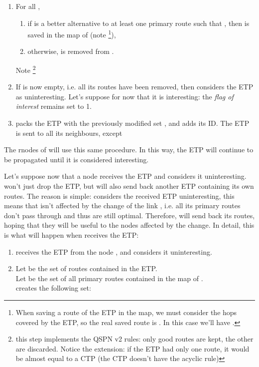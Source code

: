 \documentclass[a4paper]{article}
\begin{document}
\begin{description}
\begin{enumerate}
		If  exists, then  sets 
		\footnote{with this operation we are actually replacing 
		with , in the map }.
		Otherwise,  is copied in the temporary set .\\
		 is sorted, i.e. the routes of the map of  are sorted in
		order of efficiency.
	\item For all ,
		\begin{enumerate}
			\item if  is a better alternative to at least one primary route
				 such that ,
				then   is saved in the map of 
				(note \footnote{When saving a route  of the ETP
				in the map, we must consider the hops covered by the ETP,
				so the real saved route is
				. In this
				case we'll have .}), 
			\item otherwise,  is removed from .
		\end{enumerate}
		Note \footnote{this step implements the QSPN v2 rules: only
		good routes are kept, the other are discarded. Notice
		the extension: if the ETP had only one route, it would be
		almost equal to a CTP (the CTP doesn't have the acyclic rule)}
	\item If  is now empty, i.e. all its routes have been removed, then
		 considers the ETP as uninteresting. Let's suppose for now
		that it is interesting: the \emph{flag of interest} remains
		set to	1.
	\item  packs the ETP with the previously modified
		set , and adds its ID. The ETP is sent to all its neighbours,
		except 
	\end{enumerate}
	The rnodes of  will use this same procedure. In this way, the ETP
	will continue to be propagated until it is considered interesting.

	Let's suppose now that a node  receives the ETP and considers it
	uninteresting.  won't just drop the ETP, but will also send back
	another ETP containing its own routes. The reason is simple: 
	considers the received ETP uninteresting, this means that  isn't
	affected by the change of the link , i.e. all its primary routes don't
	pass through  and thus are still optimal. Therefore,  will
	send back its routes, hoping that they will be useful to the nodes
	affected by the change. In detail, this is what will happen when 
	receives the ETP:
	\begin{enumerate}
		\item  receives the ETP from the node , and considers it
			uninteresting.
		\item Let  be the set of routes contained in the ETP.\\
		Let  be the set of all primary routes contained in the map
		of .\\
		 creates the following set:
		

\end{enumerate}
\end{description}
\end{document}
